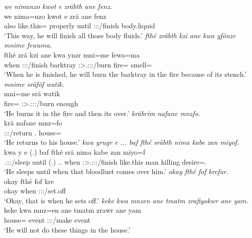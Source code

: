 \begin{exe}
	\emph{we nimanzo kwot e zräbth ane fenz.}\\
	\gll we nima=nzo kwot e zrä ane fenz\\
	also like.this=\Only{} properly until \Stsg:\Sbj:\Irr:\Pfv/finish \Dem{} body.liquid\\
	\trans `This way, he will finish all those body fluids.'
	\emph{fthé zräbth kzi ane kwa yfönzr mnime fewama.}\\
	\gll fthé zrä kzi ane kwa ynzr mni=me fewa=ma\\
	when \Stsg:\Sbj:\Irr:\Pfv/finish barktray \Dem{} \Fut{} \Stsg:\Sbj>\Tsg.\Masc:\Obj:\Nonpast:\Ipfv/burn fire=\Ins{} smell=\Char\\
	\trans `When he is finished, he will burn the barktray in the fire because of its stench.'
	\emph{mnime sräföf watik.}\\
	\gll mni=me srä watik\\
	fire=\Ins{} \Stsg:\Sbj>\Tsg.\Masc:\Obj:\Irr:\Pfv/burn enough\\
	\trans `He burns it in the fire and then its over.'
	\emph{kräbrim nafane mnzfo.}\\
	\gll krä nafane mnz=fo\\
	\Stsg:\Sbj:\Irr:\Pfv/return \Tsg.\Poss{} house=\Loc{}\\
	\trans `He returns to his house.'
	\emph{kwa yrugr e ... baf fthé sräbth nima kabe zan miyof.}\\
	\gll kwa y e (.) baf fthé srä nima kabe zan miyo=f\\
	\Fut{} \Tsg.\Masc:\Sbj:\Nonpast:\Ipfv/sleep until (.) \Recog.\Erg.\Sg{} when \Stsg:\Sbj>\Tsg.\Masc:\Obj:\Irr:\Pfv/finish like.this man killing desire=\Erg.\Sg\\
	\trans `He sleeps until when that bloodlust comes over him.'
	\emph{okay fthé fof krefar.}\\
	\gll okay fthé fof kre\\
	okay when \Emph{} \Stsg:\Sbj:\Irr:\Pfv/set.off\\
	\trans `Okay, that is when he sets off.'
	\emph{keke kwa mnzen ane tmatm zrafiyokwr ane yam.}\\
	\gll keke kwa mnz=en ane tmatm zrawr ane yam\\
	\Neg{} \Fut{} house=\Loc{} \Dem{} event \Stsg:\Sbj:\Irr:\Ipfv/make \Dem{} event\\
	\trans `He will not do these things in the house.'

\end{exe}
